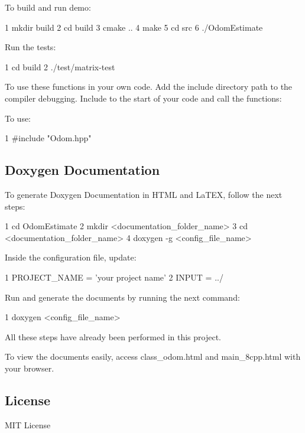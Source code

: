 \begin{DoxyItemize}
\item To build and run demo\+: 
\begin{DoxyCode}
1 mkdir build
2 cd build
3 cmake ..
4 make
5 cd src
6 ./OdomEstimate
\end{DoxyCode}

\item Run the tests\+: 
\begin{DoxyCode}
1 cd build
2 ./test/matrix-test
\end{DoxyCode}
 To use these functions in your own code. Add the include directory path to the compiler debugging. Include to the start of your code and call the functions\+:
\item To use\+: 
\begin{DoxyCode}
1 #include "Odom.hpp" 
\end{DoxyCode}

\end{DoxyItemize}

\subsection*{Doxygen Documentation}

To generate Doxygen Documentation in H\+T\+ML and La\+T\+EX, follow the next steps\+:


\begin{DoxyCode}
1 cd OdomEstimate
2 mkdir <documentation\_folder\_name>
3 cd <documentation\_folder\_name>
4 doxygen -g <config\_file\_name>
\end{DoxyCode}
 Inside the configuration file, update\+: 
\begin{DoxyCode}
1 PROJECT\_NAME = 'your project name'
2 INPUT = ../
\end{DoxyCode}
 Run and generate the documents by running the next command\+: 
\begin{DoxyCode}
1 doxygen <config\_file\_name>
\end{DoxyCode}
 All these steps have already been performed in this project.

To view the documents easily, access {\ttfamily class\+\_\+odom.\+html} and {\ttfamily main\+\_\+8cpp.\+html} with your browser.

\subsection*{License}

M\+IT License

